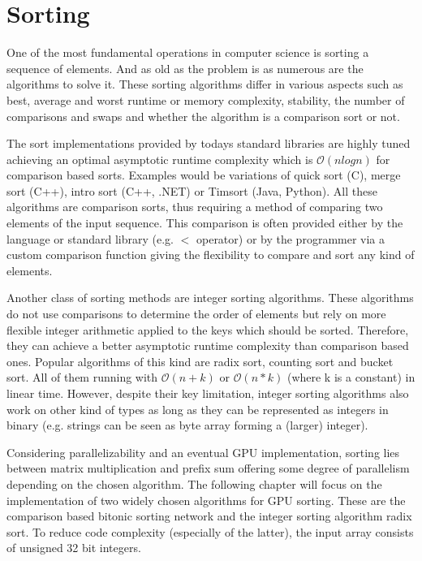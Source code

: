 \section{Sorting}
\label{sec:sorting}

One of the most fundamental operations in computer science is sorting a sequence of elements. And as old as the problem is as numerous are the algorithms to solve it. These sorting algorithms differ in various aspects such as best, average and worst runtime or memory complexity, stability, the number of comparisons and swaps and whether the algorithm is a comparison sort or not.

The sort implementations provided by todays standard libraries are highly tuned achieving an optimal asymptotic runtime complexity which is $\mathcal{O}(n log n)$ for comparison based sorts. Examples would be variations of quick sort (C), merge sort (C++), intro sort (C++, .NET) or Timsort (Java, Python). All these algorithms are comparison sorts, thus requiring a method of comparing two elements of the input sequence. This comparison is often provided either by the language or standard library (e.g. $<$ operator) or by the programmer via a custom comparison function giving the flexibility to compare and sort any kind of elements.

Another class of sorting methods are integer sorting algorithms. These algorithms do not use comparisons to determine the order of elements but rely on more flexible integer arithmetic applied to the keys which should be sorted. Therefore, they can achieve a better asymptotic runtime complexity than comparison based ones. Popular algorithms of this kind are radix sort, counting sort and bucket sort. All of them running with $\mathcal{O}(n + k)$ or $\mathcal{O}(n * k)$ (where k is a constant) in linear time.
However, despite their key limitation, integer sorting algorithms also work on other kind of types as long as they can be represented as integers in binary (e.g. strings can be seen as byte array forming a (larger) integer).

Considering parallelizability and an eventual GPU implementation, sorting lies between matrix multiplication and prefix sum offering some degree of parallelism depending on the chosen algorithm. The following chapter will focus on the implementation of two widely chosen algorithms for GPU sorting. These are the comparison based bitonic sorting network and the integer sorting algorithm radix sort. To reduce code complexity (especially of the latter), the input array consists of unsigned 32 bit integers.


